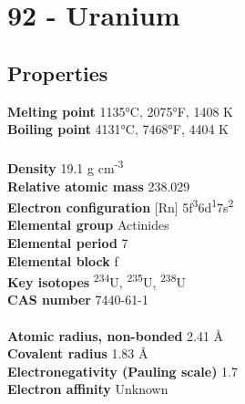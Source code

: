 \section{92 - Uranium}
\label{sec:elem-uranium}
\subsection{Properties}
\textbf{Melting point} 1135°C, 2075°F, 1408 K\\
\textbf{Boiling point} 4131°C, 7468°F, 4404 K\\
\\
\textbf{Density} 19.1 g cm\textsuperscript{-3}\\
\textbf{Relative atomic mass} 238.029\\
\textbf{Electron configuration} [Rn] 5f\textsuperscript{3}6d\textsuperscript{1}7s\textsuperscript{2}\\
\textbf{Elemental group} Actinides\\
\textbf{Elemental period} 7\\
\textbf{Elemental block} f\\
\textbf{Key isotopes} \textsuperscript{234}U, \textsuperscript{235}U, \textsuperscript{238}U\\
\textbf{CAS number} 7440-61-1\\
\\
\textbf{Atomic radius, non-bonded} 2.41 Å\\
\textbf{Covalent radius} 1.83 Å\\
\textbf{Electronegativity (Pauling scale)} 1.7\\
\textbf{Electron affinity} Unknown\\